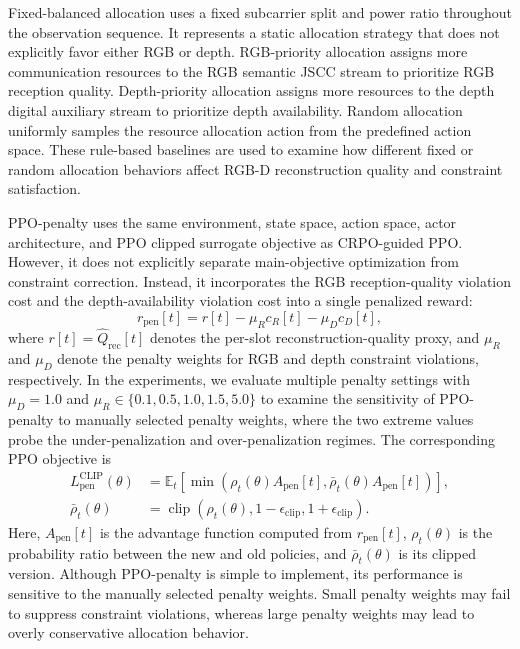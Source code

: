 \documentclass[journal]{IEEEtran}
\begin{document}
Fixed-balanced allocation uses a fixed subcarrier split and power ratio throughout the observation sequence. 
It represents a static allocation strategy that does not explicitly favor either RGB or depth. 
RGB-priority allocation assigns more communication resources to the RGB semantic JSCC stream to prioritize RGB reception quality. 
Depth-priority allocation assigns more resources to the depth digital auxiliary stream to prioritize depth availability. 
Random allocation uniformly samples the resource allocation action from the predefined action space. 
These rule-based baselines are used to examine how different fixed or random allocation behaviors affect RGB-D reconstruction quality and constraint satisfaction.

PPO-penalty uses the same environment, state space, action space, actor architecture, and PPO clipped surrogate objective as CRPO-guided PPO. 
However, it does not explicitly separate main-objective optimization from constraint correction. 
Instead, it incorporates the RGB reception-quality violation cost and the depth-availability violation cost into a single penalized reward:
\begin{equation}
r_{\mathrm{pen}}[t]
=
r[t]
-
\mu_R c_R[t]
-
\mu_D c_D[t],
\end{equation}
where $r[t]=\hat{Q}_{\mathrm{rec}}[t]$ denotes the per-slot reconstruction-quality proxy, and $\mu_R$ and $\mu_D$ denote the penalty weights for RGB and depth constraint violations, respectively. 
In the experiments, we evaluate multiple penalty settings with $\mu_D=1.0$ and $\mu_R\in\{0.1,0.5,1.0,1.5,5.0\}$ to examine the sensitivity of PPO-penalty to manually selected penalty weights, where the two extreme values probe the under-penalization and over-penalization regimes. 
The corresponding PPO objective is
\begin{equation}
\begin{aligned}
L_{\mathrm{pen}}^{\mathrm{CLIP}}(\theta)
&=
\mathbb{E}_{t}
\left[
\min
\left(
\rho_t(\theta) A_{\mathrm{pen}}[t],
\bar{\rho}_t(\theta) A_{\mathrm{pen}}[t]
\right)
\right],
\\
\bar{\rho}_t(\theta)
&=
\operatorname{clip}
\left(
\rho_t(\theta),
1-\epsilon_{\mathrm{clip}},
1+\epsilon_{\mathrm{clip}}
\right).
\end{aligned}
\label{eq:ppo_penalty_objective}
\end{equation}
Here, $A_{\mathrm{pen}}[t]$ is the advantage function computed from $r_{\mathrm{pen}}[t]$, $\rho_t(\theta)$ is the probability ratio between the new and old policies, and $\bar{\rho}_t(\theta)$ is its clipped version. 
Although PPO-penalty is simple to implement, its performance is sensitive to the manually selected penalty weights. 
Small penalty weights may fail to suppress constraint violations, whereas large penalty weights may lead to overly conservative allocation behavior.
\end{document}

